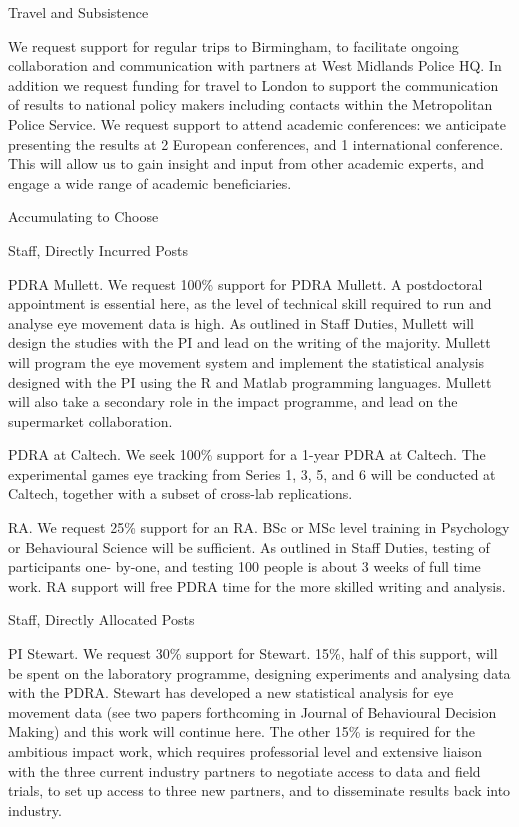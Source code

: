 Travel and Subsistence

We request support for regular trips to Birmingham, to facilitate ongoing collaboration and communication with partners at West Midlands Police HQ. In addition we request funding for travel to London to support the communication of results to national policy makers including contacts within the Metropolitan Police Service. We request support to attend academic conferences: we anticipate presenting the results at 2 European conferences, and 1 international conference. This will allow us to gain insight and input from other academic experts, and engage a wide range of academic beneficiaries.






Accumulating to Choose

Staff, Directly Incurred Posts

PDRA Mullett. We request 100\% support for PDRA Mullett. A postdoctoral appointment is
essential here, as the level of technical skill required to run and analyse eye movement data is
high. As outlined in Staff Duties, Mullett will design the studies with the PI and lead on the
writing of the majority. Mullett will program the eye movement system and implement the
statistical analysis designed with the PI using the R and Matlab programming languages.
Mullett will also take a secondary role in the impact programme, and lead on the supermarket
collaboration.

PDRA at Caltech. We seek 100\% support for a 1-year PDRA at Caltech. The experimental
games eye tracking from Series 1, 3, 5, and 6 will be conducted at Caltech, together with a
subset of cross-lab replications.

RA. We request 25\% support for an RA. BSc or MSc level training in Psychology or
Behavioural Science will be sufficient. As outlined in Staff Duties, testing of participants one-
by-one, and testing 100 people is about 3 weeks of full time work. RA support will free
PDRA time for the more skilled writing and analysis.

Staff, Directly Allocated Posts

PI Stewart. We request 30\% support for Stewart. 15\%, half of this support, will be spent on
the laboratory programme, designing experiments and analysing data with the PDRA.
Stewart has developed a new statistical analysis for eye movement data (see two papers
forthcoming in Journal of Behavioural Decision Making) and this work will continue here.
The other 15\% is required for the ambitious impact work, which requires professorial level
and extensive liaison with the three current industry partners to negotiate access to data and
field trials, to set up access to three new partners, and to disseminate results back into
industry.

